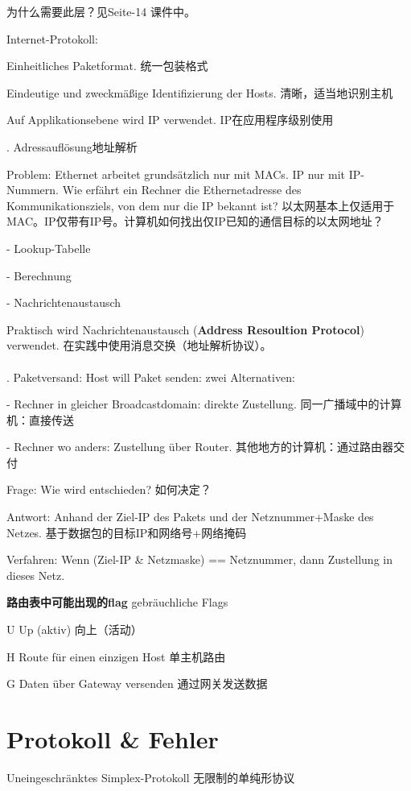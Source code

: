 \documentclass[fleqn]{article}
\begin{document}
为什么需要此层？见Seite-14 课件中。

Internet-Protokoll:

\qquad Einheitliches Paketformat. 统一包装格式

\qquad Eindeutige und zweckmäßige Identifizierung der Hosts. 清晰，适当地识别主机

\qquad Auf Applikationsebene wird IP verwendet. IP在应用程序级别使用

. Adressauflösung地址解析

Problem: Ethernet arbeitet grundsätzlich nur mit MACs. IP nur mit IP-Nummern. Wie erfährt ein Rechner die Ethernetadresse des Kommunikationsziels, von dem nur die IP bekannt ist?
以太网基本上仅适用于MAC。IP仅带有IP号。计算机如何找出仅IP已知的通信目标的以太网地址？

- Lookup-Tabelle

- Berechnung

- Nachrichtenaustausch

Praktisch wird Nachrichtenaustausch (\textbf{Address Resoultion Protocol}) verwendet. 在实践中使用消息交换（地址解析协议）。
\\
\\
. Paketversand: Host will Paket senden: zwei Alternativen:

- Rechner in gleicher Broadcastdomain: direkte Zustellung. 同一广播域中的计算机：直接传送

- Rechner wo anders: Zustellung über Router. 其他地方的计算机：通过路由器交付

Frage: Wie wird entschieden? 如何决定？

Antwort: Anhand der Ziel-IP des Pakets und der Netznummer+Maske des Netzes. 基于数据包的目标IP和网络号+网络掩码

Verfahren: Wenn (Ziel-IP \& Netzmaske) == Netznummer, dann Zustellung in dieses Netz.

\textbf{路由表中可能出现的flag} gebräuchliche Flags

U	Up (aktiv) 向上（活动）

H	Route für einen einzigen Host 单主机路由

G	Daten über Gateway versenden 通过网关发送数据

\section{Protokoll \& Fehler}

 Uneingeschränktes Simplex-Protokoll 无限制的单纯形协议
\end{document}
